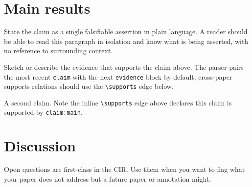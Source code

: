 \documentclass{rrvix}
\begin{document}
\section{Main results}
\label{sec:results}

\begin{claim}
\label{claim:main}
State the claim as a single falsifiable assertion in plain language.
A reader should be able to read this paragraph in isolation and know
what is being asserted, with no reference to surrounding context.
\end{claim}

\begin{evidence}
\label{ev:main}
Sketch or describe the evidence that supports the claim above. The
parser pairs the most recent \texttt{claim} with the next
\texttt{evidence} block by default; cross-paper supports relations
should use the \texttt{\textbackslash supports} edge below.
\end{evidence}



\begin{claim}
\label{claim:secondary}
A second claim. Note the inline \texttt{\textbackslash supports} edge
above declares this claim is supported by \texttt{claim:main}.
\end{claim}

\section{Discussion}
\label{sec:discussion}

\begin{openquestion}
\label{oq:scaling}
Open questions are first-class in the CIR. Use them when you want to
flag what your paper does not address but a future paper or annotation
might.
\end{openquestion}
\end{document}
